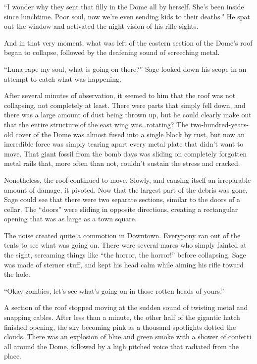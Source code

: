 ``I wonder why they sent that filly in the Dome all by herself. She's been inside since lunchtime. Poor soul, now we're even sending kids to their deaths.'' He spat out the window and activated the night vision of his rifle sights.

And in that very moment, what was left of the eastern section of the Dome's roof began to collapse, followed by the deafening sound of screeching metal.

``Luna rape my soul, what is going on there?'' Sage looked down his scope in an attempt to catch what was happening.

After several minutes of observation, it seemed to him that the roof was not collapsing, not completely at least. There were parts that simply fell down, and there was a large amount of dust being thrown up, but he could clearly make out that the entire structure of the east wing was\dots rotating? The two-hundred-years-old cover of the Dome was almost fused into a single block by rust, but now an incredible force was simply tearing apart every metal plate that didn't want to move. That giant fossil from the bomb days was sliding on completely forgotten metal rails that, more often than not, couldn't sustain the stress and cracked.

Nonetheless, the roof continued to move. Slowly, and causing itself an irreparable amount of damage, it pivoted. Now that the largest part of the debris was gone, Sage could see that there were two separate sections, similar to the doors of a cellar. The ``doors'' were sliding in opposite directions, creating a rectangular opening that was as large as a town square.

The noise created quite a commotion in Downtown. Everypony ran out of the tents to see what was going on. There were several mares who simply fainted at the sight, screaming things like ``the horror, the horror!'' before collapsing. Sage was made of sterner stuff, and kept his head calm while aiming his rifle toward the hole.

``Okay zombies, let's see what's going on in those rotten heads of yours.''

A section of the roof stopped moving at the sudden sound of twisting metal and snapping cables. After less than a minute, the other half of the gigantic hatch finished opening, the sky becoming pink as a thousand spotlights dotted the clouds. There was an explosion of blue and green smoke with a shower of confetti all around the Dome, followed by a high pitched voice that radiated from the place.

